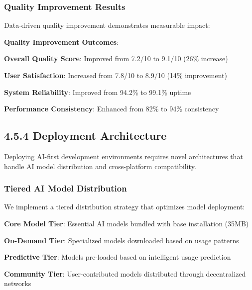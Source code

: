 \subsubsection*{Quality Improvement Results}

Data-driven quality improvement demonstrates measurable impact:

\begin{successbox}
\textbf{Quality Improvement Outcomes}:
\begin{compactlist}
    \item \textbf{Overall Quality Score}: Improved from 7.2/10 to 9.1/10 (26\% increase)
    \item \textbf{User Satisfaction}: Increased from 7.8/10 to 8.9/10 (14\% improvement)
    \item \textbf{System Reliability}: Improved from 94.2\% to 99.1\% uptime
    \item \textbf{Performance Consistency}: Enhanced from 82\% to 94\% consistency
\end{compactlist}
\end{successbox}

\subsection*{4.5.4 Deployment Architecture}
\label{subsec:deployment-architecture}

Deploying AI-first development environments requires novel architectures that handle AI model distribution and cross-platform compatibility.

\subsubsection*{Tiered AI Model Distribution}

We implement a tiered distribution strategy that optimizes model deployment:

\begin{expandedlist}
    \item \textbf{Core Model Tier}: Essential AI models bundled with base installation (35MB)
    \item \textbf{On-Demand Tier}: Specialized models downloaded based on usage patterns
    \item \textbf{Predictive Tier}: Models pre-loaded based on intelligent usage prediction
    \item \textbf{Community Tier}: User-contributed models distributed through decentralized networks
\end{expandedlist}

